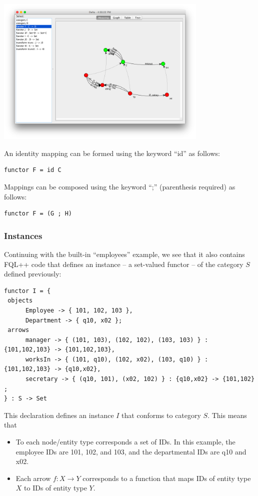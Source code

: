 \documentclass[12pt]{article}
\begin{document}
\begin{center}
\includegraphics[width=4in]{mapping}
\end{center}

An identity mapping can be formed using the keyword ``id'' as follows:
\begin{verbatim}
functor F = id C
\end{verbatim}
Mappings can be composed using the keyword ``;'' (parenthesis required) as follows:
\begin{verbatim}
functor F = (G ; H)
\end{verbatim}

\subsubsection{Instances}

Continuing with the built-in ``employees'' example, we see that it also contains FQL++ code that defines an instance -- a set-valued functor -- of the category $S$ defined previously:

\begin{verbatim}
functor I = {
 objects
	  Employee -> { 101, 102, 103 },
	  Department -> { q10, x02 };
 arrows
	  manager -> { (101, 103), (102, 102), (103, 103) } : {101,102,103} -> {101,102,103},
	  worksIn -> { (101, q10), (102, x02), (103, q10) } : {101,102,103} -> {q10,x02},
	  secretary -> { (q10, 101), (x02, 102) } : {q10,x02} -> {101,102} ;
} : S -> Set
\end{verbatim}

This declaration defines an instance $I$ that conforms to category $S$.  This means that
\begin{itemize}
\item To each node/entity type corresponds a set of IDs.  In this example, the employee IDs are 101, 102, and 103, and the departmental IDs are q10 and x02.
\item Each arrow $f : X \to Y$ corresponds to a function that maps IDs of entity type $X$ to IDs of entity type $Y$.  
\end{itemize}
\end{document}
